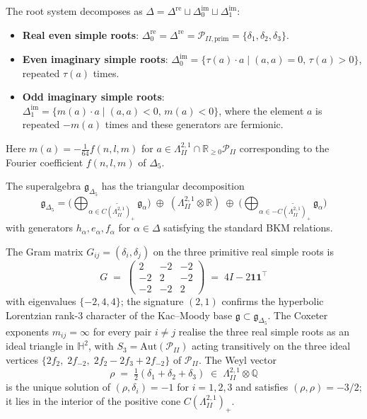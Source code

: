 \begin{construction}
\label{constr:k3e-roots}
The root system decomposes as $\Delta = \Delta^{\mathrm{re}} \sqcup \Delta^{\mathrm{im}}_0 \sqcup \Delta^{\mathrm{im}}_1$:
\begin{itemize}
 \item \textbf{Real even simple roots}: $\Delta^{\mathrm{re}}_0 = \Delta^{\mathrm{re}} = \mathcal{P}_{II,\mathrm{prim}} = \{\delta_1, \delta_2, \delta_3\}$.
 \item \textbf{Even imaginary simple roots}: $\Delta^{\mathrm{im}}_0 = \{ \tau(a) \cdot a \mid (a,a) = 0, \, \tau(a) > 0 \}$, repeated $\tau(a)$ times.
 \item \textbf{Odd imaginary simple roots}: $\Delta^{\mathrm{im}}_1 = \{ m(a) \cdot a \mid (a,a) < 0, \, m(a) < 0 \}$, where the element $a$ is repeated $-m(a)$ times and these generators are fermionic.
\end{itemize}
Here $m(a) = -\frac{1}{64} f(n,l,m)$ for $a \in \Lambda^{2,1}_{II} \cap \mathbb{R}_{\geq 0} \mathcal{P}_{II}$ corresponding to the Fourier coefficient $f(n,l,m)$ of $\Delta_5$.
\end{construction}

The superalgebra $\mathfrak{g}_{\Delta_5}$ has the triangular decomposition
\[
 \mathfrak{g}_{\Delta_5} = \biggl(\bigoplus_{\alpha \in \widetilde{C(\Lambda^{2,1}_{II})_+}} \mathfrak{g}_\alpha\biggr) \;\oplus\; (\Lambda^{2,1}_{II} \otimes \mathbb{R}) \;\oplus\; \biggl(\bigoplus_{\alpha \in -\widetilde{C(\Lambda^{2,1}_{II})_+}} \mathfrak{g}_\alpha\biggr)
\]
with generators $h_\alpha, e_\alpha, f_\alpha$ for $\alpha \in \Delta$ satisfying the standard BKM relations.

\begin{proposition}
\label{prop:k3e-cartan-and-weyl}
The Gram matrix $G_{ij} = (\delta_i, \delta_j)$ on the three primitive real simple roots is
\[
 G \;=\; \begin{pmatrix} 2 & -2 & -2 \\ -2 & 2 & -2 \\ -2 & -2 & 2 \end{pmatrix}
 \;=\; 4 I - 2 \mathbf{1}\mathbf{1}^\top
\]
with eigenvalues $\{-2, 4, 4\}$; the signature $(2, 1)$ confirms the hyperbolic Lorentzian rank-$3$ character of the Kac--Moody base $\mathfrak{g} \subset \mathfrak{g}_{\Delta_5}$. The Coxeter exponents $m_{ij} = \infty$ for every pair $i \neq j$ realise the three real simple roots as an ideal triangle in $\mathbb{H}^2$, with $S_3 = \mathrm{Aut}(\mathcal{P}_{II})$ acting transitively on the three ideal vertices $\{2 f_2,\; 2 f_{-2},\; 2 f_2 - 2 f_3 + 2 f_{-2}\}$ of $\mathcal{P}_{II}$. The Weyl vector
\[
 \rho \;=\; \tfrac{1}{2}(\delta_1 + \delta_2 + \delta_3) \;\in\; \Lambda^{2,1}_{II} \otimes \mathbb{Q}
\]
is the unique solution of $(\rho, \delta_i) = -1$ for $i = 1, 2, 3$ and satisfies $(\rho, \rho) = -3/2$; it lies in the interior of the positive cone $C(\Lambda^{2,1}_{II})_+$.
\end{proposition}

